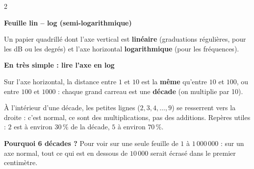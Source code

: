 \documentclass[a4paper,9pt]{extarticle}
\begin{document}
\begin{multicols}{2}
\begin{definition}
\textbf{Feuille lin -- log (semi-logarithmique)}

Un papier quadrillé dont l'axe vertical est \textbf{linéaire} (graduations régulières, pour les dB ou les degrés) et l'axe horizontal \textbf{logarithmique} (pour les fréquences).

\end{definition}


\begin{important}

\textbf{En très simple : lire l'axe en log}

Sur l'axe horizontal, la distance entre $1$ et $10$ est la \textbf{même} qu'entre $10$ et $100$, ou entre $100$ et $1000$ : chaque grand carreau est une \textbf{décade} (on multiplie par 10).

\vspace{3pt}

À l'intérieur d'une décade, les petites lignes ($2, 3, 4, \dots, 9$) se resserrent vers la droite : c'est normal, ce sont des multiplications, pas des additions. Repères utiles : $2$ est à environ $30\,\%$ de la décade, $5$ à environ $70\,\%$.

\vspace{3pt}

\textbf{Pourquoi 6 décades ?} Pour voir sur une seule feuille de $1$ à $1\,000\,000$ : sur un axe normal, tout ce qui est en dessous de $10\,000$ serait écrasé dans le premier centimètre.

\end{important}


\end{multicols}
\end{document}
